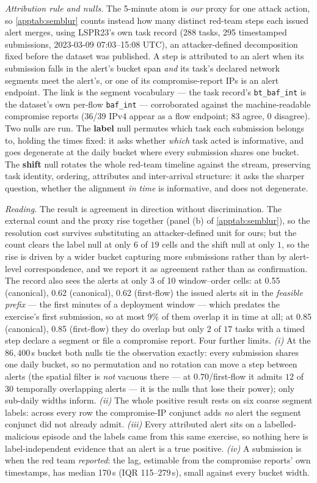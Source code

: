 \emph{Attribution rule and nulls.} The 5-minute atom is \emph{our} proxy for one attack action, so
\cref{apptab:semblur} counts instead how many distinct red-team steps each issued alert merges, using
LSPR23's own task record (288 tasks, 295 timestamped submissions,
2023-03-09 07:03--15:08 UTC), an attacker-defined decomposition fixed before the dataset was
published. A step is attributed to an alert when its submission falls in the alert's bucket span
\emph{and} its task's declared network segments meet the alert's, or one of its compromise-report IPs
is an alert endpoint. The link is the segment vocabulary --- the task record's \texttt{bt\_baf\_int}
is the dataset's own per-flow \texttt{baf\_int} --- corroborated against the machine-readable
compromise reports (36/39 IPv4 appear as a flow endpoint;
83 agree, 0 disagree). Two nulls are run. The \textbf{label} null permutes which
task each submission belongs to, holding the times fixed: it asks whether \emph{which} task acted is
informative, and goes degenerate at the daily bucket where every submission shares one bucket. The
\textbf{shift} null rotates the whole red-team timeline against the stream, preserving task identity,
ordering, attributes and inter-arrival structure: it asks the sharper question, whether the alignment
\emph{in time} is informative, and does not degenerate.

\emph{Reading.} The result is agreement in direction without discrimination. The external count and
the proxy rise together (panel (b) of \cref{apptab:semblur}), so the resolution cost survives
substituting an attacker-defined unit for ours; but the count clears the label null at only $6$ of
$19$ cells and the shift null at only $1$, so the rise is driven by a wider bucket capturing more
submissions rather than by alert-level correspondence, and we report it as agreement rather than as
confirmation. The record also sees the alerts at only 3 of 10 window--order
cells: at 0.55 (canonical), 0.62 (canonical), 0.62 (first-flow) the issued alerts sit in the \emph{feasible prefix} --- the first
minutes of a deployment window --- which predates the exercise's first submission, so at most
$9\%$ of them overlap it in time at all; at 0.85 (canonical), 0.85 (first-flow) they do overlap but only $2$ of $17$ tasks with a
timed step declare a segment or file a compromise report. Four further limits. \emph{(i)} At the
$86{,}400$\,s bucket both nulls tie the observation exactly: every submission shares one daily bucket,
so no permutation and no rotation can move a step between alerts (the spatial filter is \emph{not}
vacuous there --- at $0.70$/first-flow it admits $12$ of $30$ temporally overlapping alerts --- it is
the nulls that lose their power); only sub-daily widths inform. \emph{(ii)} The whole positive result
rests on six coarse segment labels: across every row the compromise-IP conjunct adds \emph{no} alert
the segment conjunct did not already admit. \emph{(iii)} Every attributed alert sits on a
labelled-malicious episode and the labels came from this same exercise, so nothing here is
label-independent evidence that an alert is a true positive. \emph{(iv)} A submission is when the red
team \emph{reported}: the lag, estimable from the compromise reports' own timestamps, has median
170\,s (IQR 115--279\,s), small against every bucket width.

